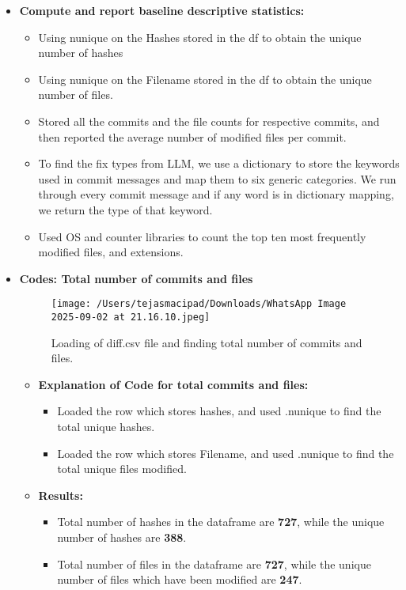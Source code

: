 \documentclass[12pt, a4paper]{report}
\begin{document}
\begin{itemize}
    \item \textbf{Compute and report baseline descriptive statistics:}
    \begin{itemize}
        \item Using nunique on the Hashes stored in the df to obtain the unique number of hashes
        \item Using nunique on the Filename stored in the df to obtain the unique number of files.
        \item Stored all the commits and the file counts for respective commits, and then reported the average number of modified files per commit.
        \item To find the fix types from LLM, we use a dictionary to store the keywords used in commit messages and map them to six generic categories. We run through every commit message and if any word is in dictionary mapping, we return the type of that keyword.
        \item Used OS and counter libraries to count the top ten most frequently modified files, and extensions.
    \end{itemize}
    \item \textbf{Codes: Total number of commits and files}
        \begin{figure}[h!]
            \centering
            \texttt{[image: /Users/tejasmacipad/Downloads/WhatsApp Image 2025-09-02 at 21.16.10.jpeg]}
            \caption{Loading of diff.csv file and finding total number of commits and files.}
            \label{fig:diff-example}
        \end{figure}

        \begin{itemize}
            \item \textbf{Explanation of Code for total commits and files:}
            \begin{itemize}
                \item Loaded the row which stores hashes, and used .nunique to find the total unique hashes.
                \item Loaded the row which stores Filename, and used .nunique to find the total unique files modified.
            \end{itemize}
        \end{itemize}

        \begin{itemize}
            \item \textbf{Results:}
            \begin{itemize}
                \item Total number of hashes in the dataframe are \textbf{727}, while the unique number of hashes are \textbf{388}.
                \item Total number of files in the dataframe are \textbf{727}, while the unique number of files which have been modified are \textbf{247}.
            \end{itemize}
        \end{itemize}


\end{itemize}
\end{document}
